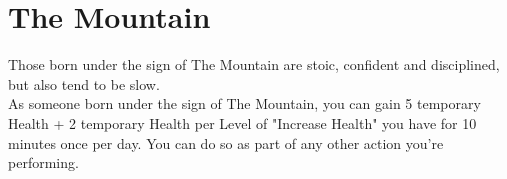 \section{The Mountain}\label{zodiac:mountain}

Those born under the sign of The Mountain are stoic, confident and disciplined, but also tend to be slow.\\
As someone born under the sign of The Mountain, you can gain 5 temporary Health + 2 temporary Health per Level of "Increase Health" you have for 10 minutes once per day.
You can do so as part of any other action you're performing.\\